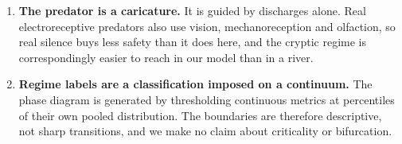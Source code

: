 \begin{enumerate}[leftmargin=1.4em,itemsep=2pt,topsep=2pt]
      express cost in reward units and report the fraction of the achieved return
      it consumes so that it can be compared with measured energy budgets, but we
      do not model the electrocyte physiology that sets the true cost, nor its
      dependence on amplitude.
\item \textbf{The predator is a caricature.} It is guided by discharges alone. Real
      electroreceptive predators also use vision, mechanoreception and olfaction,
      so real silence buys less safety than it does here, and the cryptic regime is
      correspondingly easier to reach in our model than in a river.
\item \textbf{Regime labels are a classification imposed on a continuum.} The
      phase diagram is generated by thresholding continuous metrics at percentiles
      of their own pooled distribution. The boundaries are therefore descriptive,
      not sharp transitions, and we make no claim about criticality or
      bifurcation.
\end{enumerate}

